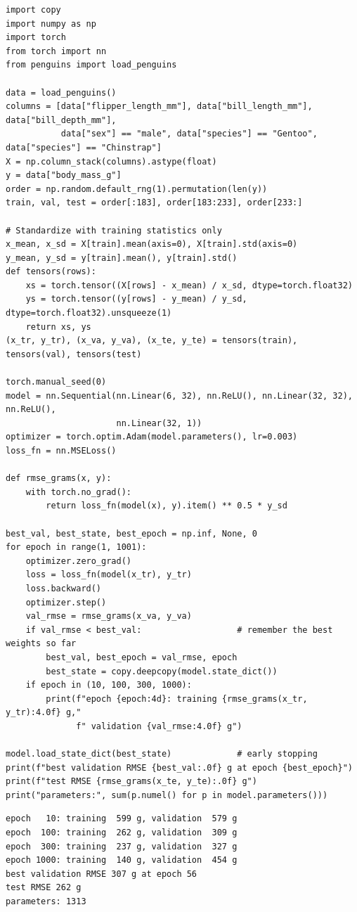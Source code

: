 \begin{verbatim}
import copy
import numpy as np
import torch
from torch import nn
from penguins import load_penguins

data = load_penguins()
columns = [data["flipper_length_mm"], data["bill_length_mm"], data["bill_depth_mm"],
           data["sex"] == "male", data["species"] == "Gentoo", data["species"] == "Chinstrap"]
X = np.column_stack(columns).astype(float)
y = data["body_mass_g"]
order = np.random.default_rng(1).permutation(len(y))
train, val, test = order[:183], order[183:233], order[233:]

# Standardize with training statistics only
x_mean, x_sd = X[train].mean(axis=0), X[train].std(axis=0)
y_mean, y_sd = y[train].mean(), y[train].std()
def tensors(rows):
    xs = torch.tensor((X[rows] - x_mean) / x_sd, dtype=torch.float32)
    ys = torch.tensor((y[rows] - y_mean) / y_sd, dtype=torch.float32).unsqueeze(1)
    return xs, ys
(x_tr, y_tr), (x_va, y_va), (x_te, y_te) = tensors(train), tensors(val), tensors(test)

torch.manual_seed(0)
model = nn.Sequential(nn.Linear(6, 32), nn.ReLU(), nn.Linear(32, 32), nn.ReLU(),
                      nn.Linear(32, 1))
optimizer = torch.optim.Adam(model.parameters(), lr=0.003)
loss_fn = nn.MSELoss()

def rmse_grams(x, y):
    with torch.no_grad():
        return loss_fn(model(x), y).item() ** 0.5 * y_sd

best_val, best_state, best_epoch = np.inf, None, 0
for epoch in range(1, 1001):
    optimizer.zero_grad()
    loss = loss_fn(model(x_tr), y_tr)
    loss.backward()
    optimizer.step()
    val_rmse = rmse_grams(x_va, y_va)
    if val_rmse < best_val:                   # remember the best weights so far
        best_val, best_epoch = val_rmse, epoch
        best_state = copy.deepcopy(model.state_dict())
    if epoch in (10, 100, 300, 1000):
        print(f"epoch {epoch:4d}: training {rmse_grams(x_tr, y_tr):4.0f} g,"
              f" validation {val_rmse:4.0f} g")

model.load_state_dict(best_state)             # early stopping
print(f"best validation RMSE {best_val:.0f} g at epoch {best_epoch}")
print(f"test RMSE {rmse_grams(x_te, y_te):.0f} g")
print("parameters:", sum(p.numel() for p in model.parameters()))
\end{verbatim}

\begin{verbatim}
epoch   10: training  599 g, validation  579 g
epoch  100: training  262 g, validation  309 g
epoch  300: training  237 g, validation  327 g
epoch 1000: training  140 g, validation  454 g
best validation RMSE 307 g at epoch 56
test RMSE 262 g
parameters: 1313
\end{verbatim}

